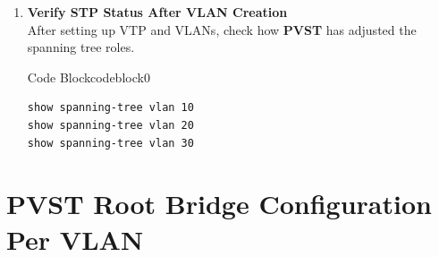 \documentclass[a4paper]{book}
\begin{document}
\begin{enumerate}
	\item \textbf{Verify STP Status After VLAN Creation} \\
	      After setting up VTP and VLANs, check how \textbf{PVST} has adjusted the spanning tree roles.




	      \begin{ocg}{Code Block}{codeblock}{0}
		      \vspace{0.5cm}
		      \begin{lstlisting}
show spanning-tree vlan 10
show spanning-tree vlan 20
show spanning-tree vlan 30
\end{lstlisting}

	      \end{ocg}


\end{enumerate}

\section*{PVST Root Bridge Configuration Per VLAN}
\end{document}
